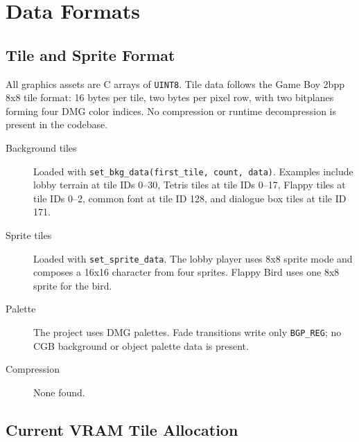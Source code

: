 \chapter{Data Formats}

\section{Tile and Sprite Format}

All graphics assets are C arrays of \texttt{UINT8}. Tile data follows the Game Boy 2bpp 8x8 tile format: 16 bytes per tile, two bytes per pixel row, with two bitplanes forming four DMG color indices. No compression or runtime decompression is present in the codebase.

\begin{description}
  \item[Background tiles] Loaded with \texttt{set\_bkg\_data(first\_tile, count, data)}. Examples include lobby terrain at tile IDs 0--30, Tetris tiles at tile IDs 0--17, Flappy tiles at tile IDs 0--2, common font at tile ID 128, and dialogue box tiles at tile ID 171.
  \item[Sprite tiles] Loaded with \texttt{set\_sprite\_data}. The lobby player uses 8x8 sprite mode and composes a 16x16 character from four sprites. Flappy Bird uses one 8x8 sprite for the bird.
  \item[Palette] The project uses DMG palettes. Fade transitions write only \texttt{BGP\_REG}; no CGB background or object palette data is present.
  \item[Compression] None found.
\end{description}

\section{Current VRAM Tile Allocation}

